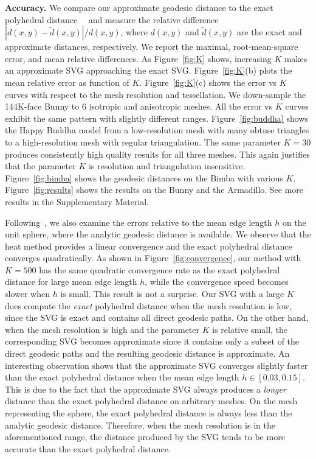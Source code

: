 \noindent\textbf{Accuracy.} We compare our approximate geodesic
distance to the exact polyhedral
distance~\cite{Mitchell_Etc:1987}~\cite{Xin_Wang:2009} and measure
the relative difference $|d(x,y)-\widetilde{d}(x,y)|/d(x,y)$, where
$d(x,y)$ and $\widetilde{d}(x,y)$ are the exact and approximate
distances, respectively. We report the maximal, root-mean-square
error, and mean relative differences. As Figure~\ref{fig:K} shows,
increasing $K$ makes an approximate SVG approaching the exact SVG.
Figure~\ref{fig:K}(b) plots the mean relative error as function of
$K$. Figure~\ref{fig:K}(c) shows the error vs $K$ curves with
respect to the mesh resolution and tessellation. We down-sample the
144K-face Bunny to 6 isotropic and anisotropic meshes. All the error
vs $K$ curves exhibit the same pattern with slightly different
ranges. Figure~\ref{fig:buddha} shows the Happy Buddha model from a
low-resolution mesh with many obtuse triangles to a high-resolution
mesh with regular triangulation. The same parameter $K=30$ produces
consistently high quality results for all three meshes. This again
justifies that the parameter $K$ is resolution and triangulation
insensitive. Figure~\ref{fig:bimba} shows the geodesic distances on
the Bimba with various $K$. Figure~\ref{fig:results} shows the
results on the Bunny and the Armadillo. See more results in the
Supplementary Material.

Following~\cite{heat_tog}, we also examine the errors relative to
the mean edge length $h$ on the unit sphere, where the analytic
geodesic distance is available. We observe that the heat method
provides a linear convergence and the exact polyhedral distance
converges quadratically. As shown in Figure~\ref{fig:convergence},
our method with $K=500$ has the same quadratic convergence rate as
the exact polyhedral distance for large mean edge length $h$, while
the convergence speed becomes slower when $h$ is small. This result
is not a surprise. Our SVG with a large $K$ does compute the
\textit{exact} polyhedral distance when the mesh resolution is low,
since the SVG is exact and contains all direct geodesic paths. On
the other hand, when the mesh resolution is high and the parameter
$K$ is relative small, the corresponding SVG becomes approximate
since it contains only a subset of the direct geodesic paths and the
resulting geodesic distance is approximate. An interesting
observation shows that the approximate SVG converges slightly faster
than the exact polyhedral distance when the mean edge length
$h\in[0.03,0.15]$. This is due to the fact that the approximate SVG
always produces a \textit{longer} distance than the exact polyhedral
distance on arbitrary meshes. On the mesh representing the sphere,
the exact polyhedral distance is always less than the analytic
geodesic distance. Therefore, when the mesh resolution is in the
aforementioned range, the distance produced by the SVG tends to be
more accurate than the exact polyhedral distance.


